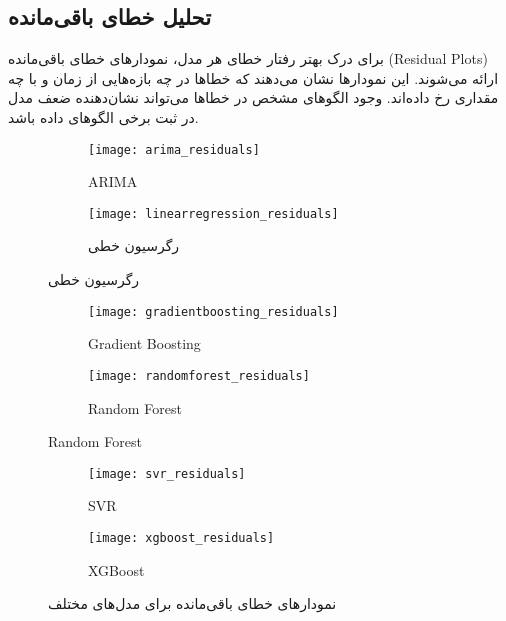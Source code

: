 









\subsection{تحلیل خطای باقی‌مانده}
برای درک بهتر رفتار خطای هر مدل، نمودارهای خطای باقی‌مانده (Residual Plots) ارائه می‌شوند. این نمودارها نشان می‌دهند که خطاها در چه بازه‌هایی از زمان و با چه مقداری رخ داده‌اند. وجود الگوهای مشخص در خطاها می‌تواند نشان‌دهنده ضعف مدل در ثبت برخی الگوهای داده باشد.

\begin{figure}[H]
	\centering
	\begin{subfigure}{0.48\textwidth}
		\centering
		\texttt{[image: arima\_residuals]}
		\caption{ARIMA}
		\label{fig:arima_residuals}
	\end{subfigure}
	\hfill
	\begin{subfigure}{0.48\textwidth}
		\centering
		\texttt{[image: linearregression\_residuals]}
		\caption{رگرسیون خطی}
		\label{fig:linearregression_residuals}
	\end{subfigure}
\end{figure}	
	
\begin{figure}[H]
	\begin{subfigure}{0.48\textwidth}
		\centering
		\texttt{[image: gradientboosting\_residuals]}
		\caption{Gradient Boosting}
		\label{fig:gradientboosting_residuals}
	\end{subfigure}
	\hfill
	\begin{subfigure}{0.48\textwidth}
		\centering
		\texttt{[image: randomforest\_residuals]}
		\caption{Random Forest}
		\label{fig:randomforest_residuals}
	\end{subfigure}
	
\end{figure}	
\begin{figure}[H]
	\begin{subfigure}{0.48\textwidth}
		\centering
		\texttt{[image: svr\_residuals]}
		\caption{SVR}
		\label{fig:svr_residuals}
	\end{subfigure}
	\hfill
	\begin{subfigure}{0.48\textwidth}
		\centering
		\texttt{[image: xgboost\_residuals]}
		\caption{XGBoost}
		\label{fig:xgboost_residuals}
	\end{subfigure}
	\caption{نمودارهای خطای باقی‌مانده برای مدل‌های مختلف}
	\label{fig:residual_plots}
\end{figure}



